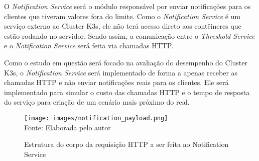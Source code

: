 O \textit{Notification Service} será o módulo responsável por enviar notificações para os clientes que tiveram valores fora do limite.
Como o \textit{Notification Service} é um serviço externo ao Cluster K3s, ele não terá acesso direto aos contêineres que estão rodando no servidor. 
Sendo assim, a comunicação entre o \textit{Threshold Service} e o \textit{Notification Service} será feita via chamadas HTTP.

Como o estudo em questão será focado na avaliação do desempenho do Cluster K3s, o \textit{Notification Service} será implementado de forma a apenas receber as chamadas HTTP e não enviar notificações reais para os clientes.
Ele será implementado para simular o custo das chamadas HTTP e o tempo de resposta do serviço para criação de um cenário mais próximo do real.

\begin{figure}
    \caption{Estrutura do corpo da requisição HTTP a ser feita ao Notification Service}
    \centering
    \texttt{[image: images/notification\_payload.png]}\\
 Fonte: Elaborada pelo autor
    \label{notification_payload}
\end{figure}


